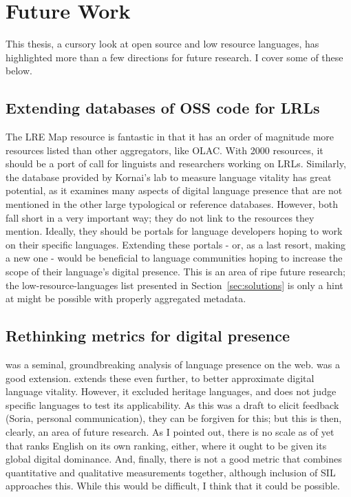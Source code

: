 \section{Future Work}
\label{sec:future-work}

This thesis, a cursory look at open source and low resource languages, has highlighted more than a few directions for future research. I cover some of these below.

\subsection{Extending databases of OSS code for LRLs}

The LRE Map resource is fantastic in that it has an order of magnitude more resources listed than other aggregators, like OLAC. With 2000 resources, it should be a port of call for linguists and researchers working on LRLs. Similarly, the database provided by Kornai's lab to measure language vitality has great potential, as it examines many aspects of digital language presence that are not mentioned in the other large typological or reference databases. However, both fall short in a very important way; they do not link to the resources they mention. Ideally, they should be portals for language developers hoping to work on their specific languages. Extending these portals - or, as a last resort, making a new one - would be beneficial to language communities hoping to increase the scope of their language's digital presence. This is an area of ripe future research; the low-resource-languages list presented in Section~\ref{sec:solutions} is only a hint at might be possible with properly aggregated metadata.

\subsection{Rethinking metrics for digital presence}
\citet{kornai2013digital} was a seminal, groundbreaking analysis of language presence on the web. \citet{gibson2016assessing} was a good extension. \citet{soria2017digital} extends these even further, to better approximate digital language vitality. However, it excluded heritage languages, and does not judge specific languages to test its applicability. As this was a draft to elicit feedback (Soria, personal communication), they can be forgiven for this; but this is then, clearly, an area of future research. As I pointed out, there is no scale as of yet that ranks English on its own ranking, either, where it ought to be given its global digital dominance. And, finally, there is not a good metric that combines quantitative and qualitative measurements together, although  inclusion of SIL approaches this. While this would be difficult, I think that it could be possible.

